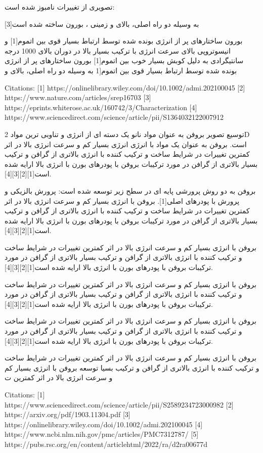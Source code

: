 تصویری از تغییرات نامبوز شده است:

به وسیله دو راه اصلی، بالای و زمینی ، بورون ساخته شده است[3]

بورون ساختارهای پر از انرژی بونده شده توسط ارتباط بسیار قوی بین اتموم[1] و انیسوتروپی بالای سرعت انرژی با ترکیب بسیار بالا در دوران بالای 1000 درجه سانتیگرادی به دلیل کوبش بسیار خوب بین اتموم[1] بورون ساختارهای پر از انرژی بونده شده توسط ارتباط بسیار قوی بین اتموم[1 به وسیله دو راه اصلی، بالای و
\begin{latin}
    
Citations:
[1] https://onlinelibrary.wiley.com/doi/10.1002/admi.202100045
[2] https://www.nature.com/articles/srep16703
[3] https://eprints.whiterose.ac.uk/160742/3/Characterization%
[4] https://www.sciencedirect.com/science/article/pii/S1364032122007912
\end{latin}
توسیع تصویر بروفن  به عنوان مواد نانو یک دسته ای از انرژی و تناوبی ترین مواد 2D است. بروفن به عنوان یک مواد با انرژی انرژی بسیار کم و سرعت انرژی بالا در اثر کمترین تغییرات در شرایط ساخت و ترکیب کننده با انرژی بالاتری از گرافن و ترکیب بسیار بالاتری از گرافن در مورد ترکیبات بروفن با پودرهای بورن با انرژی بالا ارایه شده است[1][2][3][4].

بروفن به دو روش پرورشی پایه ای در سطح زیر توسعه شده است: پرورش بالزیکی و پرورش با پودرهای اصلی[1]. بروفن با انرژی بسیار کم و سرعت انرژی بالا در اثر کمترین تغییرات در شرایط ساخت و ترکیب کننده با انرژی بالاتری از گرافن و ترکیب بسیار بالاتری از گرافن در مورد ترکیبات بروفن با پودرهای بورن با انرژی بالا ارایه شده است[1][2][3][4].

بروفن با انرژی بسیار کم و سرعت انرژی بالا در اثر کمترین تغییرات در شرایط ساخت و ترکیب کننده با انرژی بالاتری از گرافن و ترکیب بسیار بالاتری از گرافن در مورد ترکیبات بروفن با پودرهای بورن با انرژی بالا ارایه شده است[1][2][3][4].

بروفن با انرژی بسیار کم و سرعت انرژی بالا در اثر کمترین تغییرات در شرایط ساخت و ترکیب کننده با انرژی بالاتری از گرافن و ترکیب بسیار بالاتری از گرافن در مورد ترکیبات بروفن با پودرهای بورن با انرژی بالا ارایه شده است[1][2][3][4].

بروفن با انرژی بسیار کم و سرعت انرژی بالا در اثر کمترین تغییرات در شرایط ساخت و ترکیب کننده با انرژی بالاتری از گرافن و ترکیب بسیار بالاتری از گرافن در مورد ترکیبات بروفن با پودرهای بورن با انرژی بالا ارایه شده است[1][2][3][4].

بروفن با انرژی بسیار کم و سرعت انرژی بالا در اثر کمترین تغییرات در شرایط ساخت و ترکیب کننده با انرژی بالاتری از گرافن و ترکیب بسیا توسعه بروفن با انرژی بسیار کم و سرعت انرژی بالا در اثر کمترین ت
\begin{latin}

Citations:
[1] https://www.sciencedirect.com/science/article/pii/S2589234723000982
[2] https://arxiv.org/pdf/1903.11304.pdf
[3] https://onlinelibrary.wiley.com/doi/10.1002/admi.202100045
[4] https://www.ncbi.nlm.nih.gov/pmc/articles/PMC7312787/
[5] https://pubs.rsc.org/en/content/articlehtml/2022/ra/d2ra00677d
    
\end{latin}
